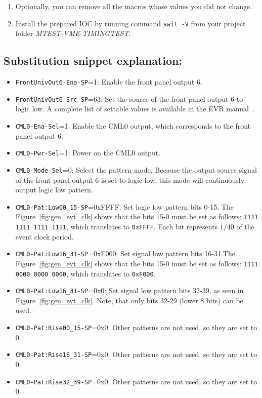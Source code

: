 \documentclass[12pt,a4paper]{article}
\begin{document}
\begin{enumerate}
	\item Optionally, you can remove all the macros whose values you did not change. 
	\item Install the prepared IOC by running command \texttt{swit -V} from your project folder \textit{MTEST-VME-TIMINGTEST}.
\end{enumerate}

\subsection{Substitution snippet explanation:}\label{sec:explain_cml}
\begin{itemize}
	\item \texttt{FrontUnivOut6-Ena-SP}=1: Enable the front panel output 6.
	\item \texttt{FrontUnivOut6-Src-SP}=63: Set the source of the front panel output 6 to logic low. A complete list of settable values is available in the EVR manual~\cite{evr_manual}.
	\item \texttt{CML0-Ena-Sel}=1: Enable the CML0 output, which corresponds to the front panel output 6.
	\item \texttt{CML0-Pwr-Sel}=1: Power on the CML0 output.
	\item \texttt{CML0-Mode-Sel}=0: Select the pattern mode. Because the output source signal of the front panel output 6 is set to logic low, this mode will continuously output logic low pattern.
	\item \texttt{CML0-Pat:Low00\_15-SP}=0xFFFF: Set logic low pattern bits 0-15. The Figure~\ref{fig:gen_evt_clk} shows that the bits 15-0 must be set as follows: \texttt{1111 1111 1111 1111}, which translates to \texttt{0xFFFF}. Each bit represents $1/40$ of the event clock period.
	\item \texttt{CML0-Pat:Low16\_31-SP}=0xF000: Set signal low pattern bits 16-31.The Figure~\ref{fig:gen_evt_clk} shows that the bits 15-0 must be set as follows: \texttt{1111 0000 0000 0000}, which translates to \texttt{0xF000}. 
	\item \texttt{CML0-Pat:Low16\_31-SP}=0x0: Set signal low pattern bits 32-39, as seen in Figure~\ref{fig:gen_evt_clk}. Note, that only bits 32-29 (lower 8 bits) can be used.
	\item \texttt{CML0-Pat:Rise00\_15-SP}=0x0: Other patterns are not used, so they are set to 0.
	\item \texttt{CML0-Pat:Rise16\_31-SP}=0x0: Other patterns are not used, so they are set to 0.
	\item \texttt{CML0-Pat:Rise32\_39-SP}=0x0: Other patterns are not used, so they are set to 0.

\end{itemize}
\end{document}
